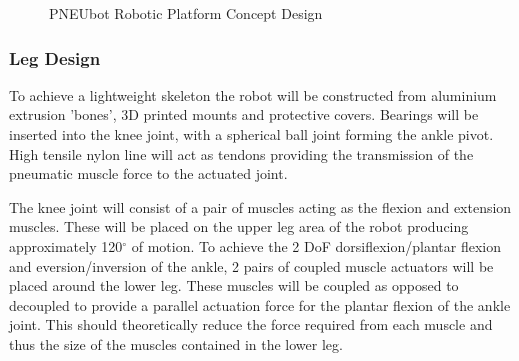 \documentclass[11pt,a4paper]{article}
\begin{document}
\begin{figure}[hbt!]
    \caption{PNEUbot Robotic Platform Concept Design}
    \label{fig:platform}
\end{figure}

\subsubsection{Leg Design}
\label{subsubsection:leg_design}

To achieve a lightweight skeleton the robot will be constructed from aluminium extrusion 'bones', 3D printed mounts and protective covers. Bearings will be inserted into the knee joint, with a spherical ball joint forming the ankle pivot. High tensile nylon line will act as tendons providing the transmission of the pneumatic muscle force to the actuated joint. \newline

The knee joint will consist of a pair of muscles acting as the flexion and extension muscles. These will be placed on the upper leg area of the robot producing approximately 120$^{\circ}$ of motion. To achieve the 2 DoF dorsiflexion/plantar flexion and eversion/inversion of the ankle, 2 pairs of coupled muscle actuators will be placed around the lower leg. These muscles will be coupled as opposed to decoupled to provide a parallel actuation force for the plantar flexion of the ankle joint. This should theoretically reduce the force required from each muscle and thus the size of the muscles contained in the lower leg. 
\end{document}
